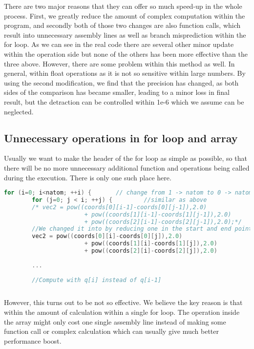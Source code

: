 \documentclass{cs4444}
\begin{document}
	 There are two major reasons that they can offer so much speed-up in the whole process. First, we greatly reduce the amount of complex computation within the program, and secondly both of those two changes are also function calls, which result into unnecessary assembly lines as well as branch misprediction within the for loop. As we can see in the real code there are several other minor update within the operation side but none of the others has been more effective than the three above. 
	 \newline
	 However, there are some problem within this method as well. In general, within float operations as it is not so sensitive within large numbers. By using the second modification, we find that the precision has changed, as both sides of the comparison has became smaller, leading to a minor loss in final result, but the detraction can be controlled within 1e-6 which we assume can be neglected.
	 
\subsection{Unnecessary operations in for loop and array} 
	Usually we want to make the header of the for loop as simple as possible, so that there will be no more unnecessary additional function and operations being called during the execution. There is only one such place here.
	 \begin{lstlisting}[language=C] 
		for (i=0; i<natom; ++i) {  		// change from 1 -> natom to 0 -> natom - 1
        for (j=0; j < i; ++j) { 	    //similar as above 
	 	/* vec2 = pow((coords[0][i-1]-coords[0][j-1]),2.0)
                       + pow((coords[1][i-1]-coords[1][j-1]),2.0)
                       + pow((coords[2][i-1]-coords[2][j-1]),2.0);*/
        //We changed it into by reducing one in the start and end point within the for loop
        vec2 = pow((coords[0][i]-coords[0][j]),2.0)
                       + pow((coords[1][i]-coords[1][j]),2.0)
                       + pow((coords[2][i]-coords[2][j]),2.0)
                       
        ...
        
        //Compute with q[i] instead of q[i-1]     
            
	 \end{lstlisting}

	However, this turns out to be not so effective. We believe the key reason is that within the amount of calculation within a single for loop. The operation inside the array might only cost one single assembly line instead of making some function call or complex calculation which can usually 	give much better performance boost.
\end{document}
